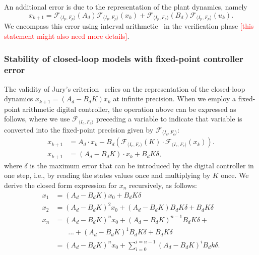 \documentclass[twocolumn]{autart}    %
\renewcommand{\note}[1]{\textcolor{red}{[#1]}}
\begin{document}
An additional error is due to the representation of the plant dynamics, namely 
%
{\scriptsize
\begin{equation*}
x_{k+1} =\mathcal{F}_{\langle I_p,F_p \rangle}(A_d) \mathcal{F}_{\langle I_p,F_p \rangle}(x_{k}) + \mathcal{F}_{\langle I_p,F_p \rangle}(B_d)\mathcal{F}_{\langle I_p,F_p \rangle}(u_{k}).
\end{equation*}
}
We encompass this error using interval arithmetic~\cite{moore1966interval} in the verification phase \note{this statement might also need more details}. 

\subsubsection{Stability of closed-loop models with fixed-point controller error}
\label{sec:stab_FWL}
The validity of Jury's criterion~\cite{fadali} relies on the representation of the closed-loop dynamics $x_{k+1} = (A_d - B_dK) x_k$ at infinite precision.  
When we employ a fixed-point arithmetic digital controller, the operation above can be expressed as follows, where we use $\mathcal{F}_{\langle I_c,F_c \rangle}$ preceding a variable to indicate that variable is converted into the fixed-point precision given by $\mathcal{F}_{\langle I_c,F_c \rangle}$: 
%
\begin{align*}
x_{k+1} &= A_d \cdot x_{k} -B_d(\mathcal{F}_{\langle I_c,F_c \rangle}(K)\cdot\mathcal{F}_{\langle I_c,F_c \rangle}(x_{k})).  \\
x_{k+1} &= (A_d  - B_dK) \cdot x_k + B_dK\delta, 
\end{align*}
%
where $\delta$ is the maximum error that can be introduced by the digital controller in one step, 
i.e., by reading the states values once and multiplying by $K$ once.  
We derive the closed form expression for $x_n$ recursively, as follows:
%
\small
\begin{align*}
x_{1} &= (A_d  - B_dK)x_0 + B_dK\delta \\
x_{2} %
 &=(A_d  - B_dK)^2x_0 + (A_d  - B_dK)B_dK\delta + B_dK\delta \\
x_{n} &= (A_d  - B_dK)^nx_0 + (A_d  - B_dK)^{n-1}B_dK\delta +\\
&\phantom{{}=1} ... + (A_d  - B_dK)^1B_dK \delta + B_dK\delta \\
  &= (A_d - B_dK)^nx_0 + \sum_{i=0}^{i=n-1}(A_d - B_dK)^iB_dk\delta. 
\end{align*}
\end{document}
